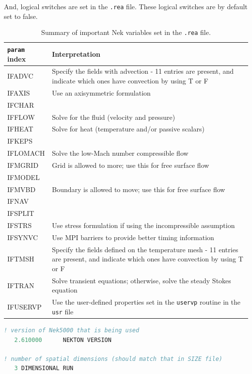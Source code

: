 \documentclass[10pt]{article}
\numberwithin{equation}{section} %
\begin{document}
\begin{itemize}
And, logical switches are set in the {\tt .rea} file. These logical switches are by default set to false.

\begin{table}[H]
\caption{Summary of important Nek variables set in the {\tt .rea} file.}
\centering
\begin{tabular}{p{3.5cm}p{11.5cm}}
\hline\hline
{\tt param} index & Interpretation \\ [0.5ex]
\hline
IFADVC & Specify the fields with advection - 11 entries are present, and indicate which ones have convection by using T or F\\
IFAXIS & Use an axisymmetric formulation\\
IFCHAR & \\
IFFLOW & Solve for the fluid (velocity and pressure)\\
IFHEAT & Solve for heat (temperature and/or passive scalars)\\
IFKEPS & \\
IFLOMACH & Solve the low-Mach number compressible flow\\
IFMGRID & Grid is allowed to more; use this for free surface flow\\
IFMODEL & \\
IFMVBD & Boundary is allowed to move; use this for free surface flow\\
IFNAV & \\
IFSPLIT & \\
IFSTRS & Use stress formulation if using the incompressible assumption\\
IFSYNVC & Use MPI barriers to provide better timing information\\
IFTMSH & Specify the fields defined on the temperature mesh - 11 entries are present, and indicate which ones have convection by using T or F\\
IFTRAN & Solve transient equations; otherwise, solve the steady Stokes equation\\
IFUSERVP & Use the user-defined properties set in the {\tt uservp} routine in the {\tt usr} file\\
\hline
\end{tabular}
\end{table}

\begin{lstlisting}[language=Fortran]
! version of Nek5000 that is being used
   2.610000      NEKTON VERSION
 
! number of spatial dimensions (should match that in SIZE file)
   3 DIMENSIONAL RUN
 

\end{lstlisting}
\end{itemize}
\end{document}
